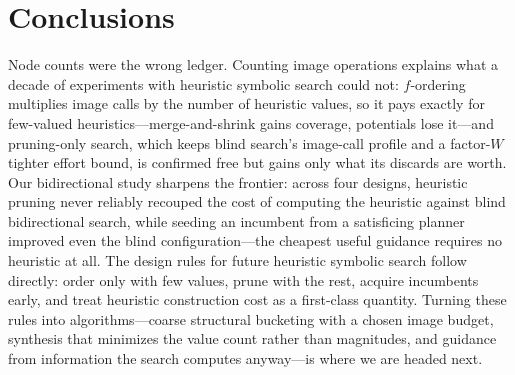 \documentclass[letterpaper]{article}
\theoremstyle{plain}
\theoremstyle{definition}
\theoremstyle{remark}
\begin{document}
\section{Conclusions}

Node counts were the wrong ledger. Counting image operations explains
what a decade of experiments with heuristic symbolic search could not:
$f$-ordering multiplies image calls by the number of heuristic values,
so it pays exactly for few-valued heuristics---merge-and-shrink gains
coverage, potentials lose it---and pruning-only search, which keeps
blind search's image-call profile and a factor-$W$ tighter effort
bound, is confirmed free but gains only what its discards are worth.
Our bidirectional study sharpens the frontier: across four designs,
heuristic pruning never reliably recouped the cost of computing the
heuristic against blind bidirectional search, while seeding an incumbent
from a satisficing planner improved even the blind configuration---the
cheapest useful guidance requires no heuristic at all. The design rules
for future heuristic symbolic search follow directly: order only with
few values, prune with the rest, acquire incumbents early, and treat
heuristic construction cost as a first-class quantity. Turning these
rules into algorithms---coarse structural bucketing with a chosen image
budget, synthesis that minimizes the value count rather than magnitudes,
and guidance from information the search computes anyway---is where we
are headed next.



\end{document}
